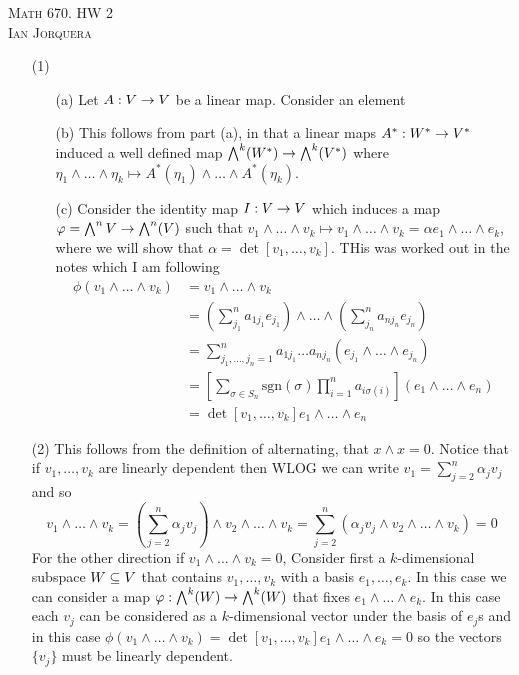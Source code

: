 \documentclass[12pt]{amsart}
\begin{document}
\begin{center}
    \textsc{Math 670. HW 2\\ Ian Jorquera}
\end{center}
\vspace{1em}
\begin{itemize} %
    \item[(1)]
    \begin{itemize}
        \item[(a)] Let $A:V\rightarrow V$ be a linear map. Consider an element 
        \item[(b)] 
        This follows from part (a), in that a linear maps $A^*:W^*\rightarrow V^*$ induced a well defined map $\bigwedge^k(W^*)\rightarrow \bigwedge^k(V^*)$ where $\eta_1\wedge\dots\wedge \eta_k\mapsto A^*(\eta_1)\wedge\dots\wedge A^*(\eta_k)$.
        \item[(c)] Consider the identity map $I:V\rightarrow V$ which induces a map $\varphi=\bigwedge^n V\rightarrow \bigwedge^n(V)$ such that $v_1\wedge\dots\wedge v_k\mapsto v_1\wedge\dots\wedge v_k=\alpha e_1\wedge\dots\wedge e_k$, where we will show that $\alpha=\det[v_1,\dots,v_k]$. THis was worked out in the notes which I am following
        \begin{align*}
            \phi(v_1\wedge\dots\wedge v_k)&=v_1\wedge\dots\wedge v_k\\
            &=\left(\sum_{j_1}^n a_{1j_1}e_{j_1}\right)\wedge\dots\wedge \left(\sum_{j_n}^n a_{nj_n}e_{j_n}\right)\\
            &= \sum_{j_1,\dots,j_n=1}^n a_{1j_1}\dots a_{nj_n}(e_{j_1}\wedge\dots\wedge e_{j_n})\\
            &= \left[\sum_{\sigma\in S_n}\text{sgn}(\sigma)\prod_{i=1}^na_{i\sigma(i)} \right](e_1\wedge\dots\wedge e_n)\\
            &=\det[v_1,\dots,v_k]e_1\wedge\dots\wedge e_n
        \end{align*}
        
    \end{itemize}
    \item[(2)] %
    This follows from the definition of alternating, that $x\wedge x=0$. Notice that if $v_1,\dots,v_k$ are linearly dependent then WLOG we can write $v_1=\sum_{j=2}^n \alpha_j v_j$ and so 
    \[v_1\wedge\dots\wedge v_k= \left(\sum_{j=2}^n \alpha_j v_j\right)\wedge v_2\wedge\dots\wedge v_k=\sum_{j=2}^n\left( \alpha_j v_j\wedge v_2\wedge\dots\wedge v_k\right)=0\]
    For the other direction if $v_1\wedge\dots\wedge v_k=0$, Consider first a $k$-dimensional subspace $W\subseteq V$ that contains $v_1,\dots,v_k$ with a basis $e_1,\dots,e_k$. In this case we can consider a map $\varphi:\bigwedge^k(W)\rightarrow\bigwedge^k(W)$ that fixes $e_1\wedge\dots\wedge e_k$. In this case each $v_j$ can be considered as a $k$-dimensional vector under the basis of $e_j$s and in this case $\phi(v_1\wedge\dots\wedge v_k)=\det[v_1,\dots,v_k]e_1\wedge\dots\wedge e_k=0$ so the vectors $\{v_j\}$ must be linearly dependent.


\end{itemize}
\end{document}

